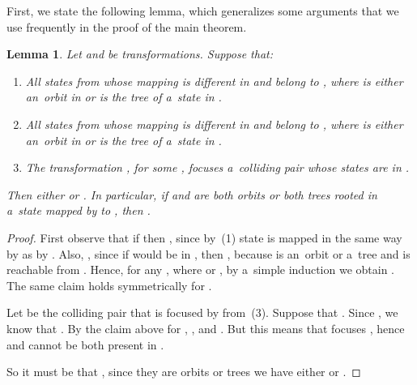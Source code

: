 \documentclass{amsart}
\newtheorem{lemma}[theorem]{Lemma}
\begin{document}
First, we state the following lemma, which generalizes some arguments that we use frequently in the proof of the main theorem.
\begin{lemma}\label{lem:orbits}
Let  and  be transformations.
Suppose that:
\begin{enumerate}
\item All states from  whose mapping is different in  and  belong to , where  is either an~orbit in  or is the tree of a~state in .
\item All states from  whose mapping is different in  and  belong to , where  is either an~orbit in  or is the tree of a~state in .
\item The transformation , for some , focuses a~colliding pair whose states are in .
\end{enumerate}
Then either  or .
In particular, if  and  are both orbits or both trees rooted in a~state mapped by  to , then .
\end{lemma}
\begin{proof}
First observe that if  then , since by~(1) state  is mapped in the same way by  as by .
Also, , since if  would be in , then , because  is an~orbit or a~tree and  is reachable from .
Hence, for any , where  or , by a~simple induction we obtain .
The same claim holds symmetrically for .

Let  be the colliding pair that is focused by  from~(3).
Suppose that .
Since , we know that .
By the claim above for , , and .
But this means that  focuses , hence  and  cannot be both present in .

So it must be that , since they are orbits or trees we have either  or .
\end{proof}
\end{document}
